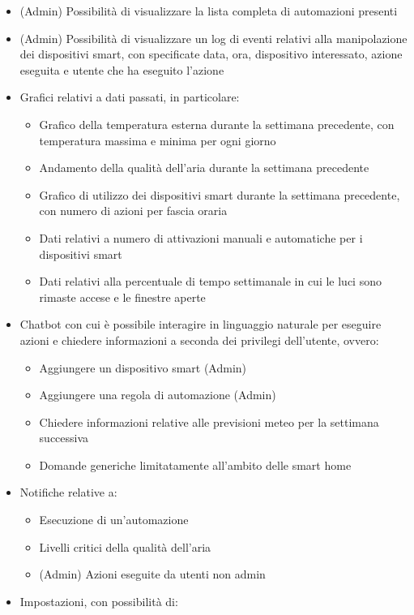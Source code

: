 \documentclass[a4paper,12pt]{article}
\begin{document}
\begin{itemize}
    \item (Admin) Possibilità di visualizzare la lista completa di automazioni presenti
    \item (Admin) Possibilità di visualizzare un log di eventi relativi alla manipolazione dei dispositivi smart, con specificate data, ora, dispositivo interessato, azione eseguita e utente che ha eseguito l'azione
    \item Grafici relativi a dati passati, in particolare:
    \begin{itemize}
        \item Grafico della temperatura esterna durante la settimana precedente, con temperatura massima e minima per ogni giorno
        \item Andamento della qualità dell'aria durante la settimana precedente
        \item Grafico di utilizzo dei dispositivi smart durante la settimana precedente, con numero di azioni per fascia oraria
        \item Dati relativi a numero di attivazioni manuali e automatiche per i dispositivi smart
        \item Dati relativi alla percentuale di tempo settimanale in cui le luci sono rimaste accese e le finestre aperte
    \end{itemize}
    \item Chatbot con cui è possibile interagire in linguaggio naturale per eseguire azioni e chiedere informazioni a seconda dei privilegi dell'utente, ovvero:
    \begin{itemize}
        \item Aggiungere un dispositivo smart (Admin)
        \item Aggiungere una regola di automazione (Admin)
        \item Chiedere informazioni relative alle previsioni meteo per la settimana successiva
        \item Domande generiche limitatamente all'ambito delle smart home
    \end{itemize}
    \item Notifiche relative a: 
    \begin{itemize}
        \item Esecuzione di un'automazione
        \item Livelli critici della qualità dell'aria
        \item (Admin) Azioni eseguite da utenti non admin
    \end{itemize}
    \item Impostazioni, con possibilità di:

\end{itemize}
\end{document}
